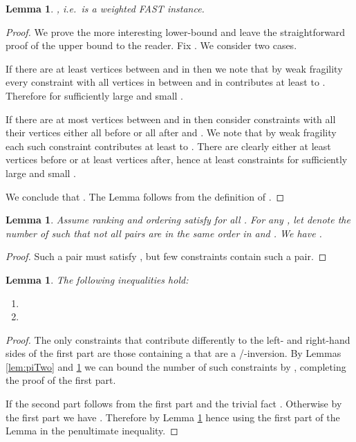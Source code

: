 \documentclass[dvips,11pt,letter]{article}
\newtheorem{lemma}[theorem]{Lemma}
\begin{document}
{\begin{lemma}\label{lem:wBarFAST}
, i.e.\  is a weighted FAST instance.
\end{lemma}
\begin{proof}
We prove the more interesting lower-bound and leave the straightforward proof of the upper bound to the reader. Fix . We consider two cases.

If there are at least  vertices between  and  in  then we note that by weak fragility every constraint  with all vertices in  between  and  in  contributes at least  to . Therefore  for sufficiently large  and small .

If there are at most  vertices between  and  in  then consider constraints with all their vertices either all before or all after  and . We note that by weak fragility each such constraint  contributes at least  to . There are clearly either at least  vertices  before or at least  vertices after, hence at least  constraints for sufficiently large  and small .

We conclude that . The Lemma follows from the definition of .
\end{proof}

\begin{lemma}\label{lem:footInv}
Assume ranking  and ordering  satisfy  for all . 
For any , let  denote the number of  such that not all pairs  are in the same order in  and . We have .
\end{lemma}
\begin{proof}
Such a pair  must satisfy , but few constraints contain such a pair.
\end{proof}

\begin{lemma}\label{lem:w} The following inequalities hold:
\begin{enumerate}
\item  
\item 
\end{enumerate}
\end{lemma}
\begin{proof}
The only constraints  that contribute differently to the left- and right-hand sides of the first part are those containing a  that are a /-inversion. By Lemmas \ref{lem:piTwo} and \ref{lem:footInv} we can bound the number of such constraints by , completing the proof of the first part.

If  the second part follows from the first part and the trivial fact . Otherwise by the first part we have . Therefore by Lemma \ref{lem:wBarFAST}  hence  using the first part of the Lemma in the penultimate inequality.
\end{proof}

}
\end{document}
